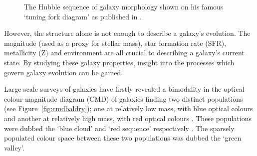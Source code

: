 \begin{figure}
\caption[The Hubble sequence for morphological classification of galaxies]{The Hubble sequence of galaxy morphology shown on his famous `tuning fork diagram' as published in \cite{hubble36}.}
\label{fig:hubble}
\end{figure}

However, the structure alone is not enough to describe a galaxy's evolution. The magnitude (used as a proxy for stellar mass), star formation rate (SFR), metallicity (Z) and environment are all crucial to describing a galaxy's current state. By studying these galaxy properties, insight into the processes which govern galaxy evolution can be gained.

Large scale surveys of galaxies have firstly revealed a bimodality in the optical colour-magnitude diagram (CMD) of galaxies finding two distinct populations (see Figure~\ref{fig:cmdbaldry}); one at relatively low mass, with blue optical colours and another at relatively high mass, with red optical colours \citep{Baldry04, Baldry06, Willmer06, ball08, Brammer09}. These populations were dubbed the `blue cloud' and `red sequence' respectively \citep{Chester64, bower92, Driver06, Faber07}.  The sparsely populated colour space between these two populations was dubbed the  `green valley'.

